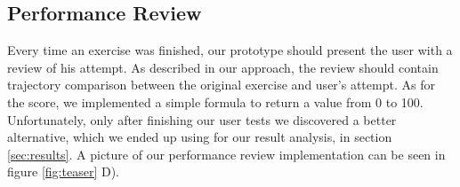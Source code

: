 \subsection{Performance Review}

Every time an exercise was finished, our prototype should present the user with a review of his attempt. 
As described in our approach, the review should contain trajectory comparison between the original exercise and user's attempt.
As for the score, we implemented a simple formula to return a value from 0 to 100. 
Unfortunately, only after finishing our user tests we discovered a better alternative, which we ended up using for our result analysis, in section \ref{sec:results}.
A picture of our performance review implementation can be seen in figure \ref{fig:teaser} D). 

